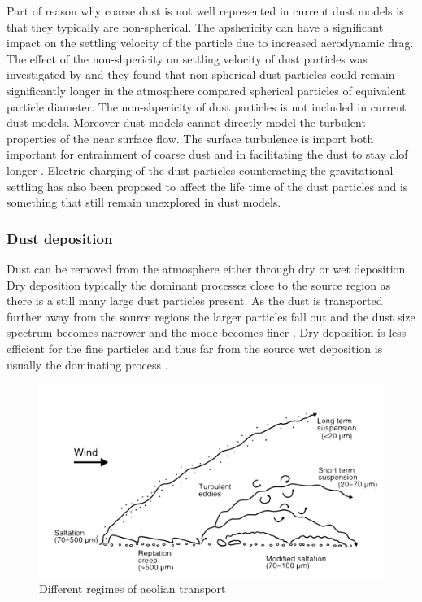 Part of reason why coarse dust is not well represented in current dust models is that they typically are non-spherical. The apshericity can have a significant impact on the settling velocity of the particle due to increased aerodynamic drag. The effect of the non-shpericity on settling velocity of dust particles was investigated by \textcite{mallios2020effects} and they found that non-spherical dust particles could remain significantly longer in the atmosphere compared spherical particles of equivalent particle diameter. The non-shpericity of dust particles is not included in current dust models. Moreover dust models cannot directly model the turbulent properties of the near surface flow. The surface turbulence is import both important for entrainment of coarse dust \parencite{klose2013large} and in facilitating the dust to stay alof longer \parencite{ryder2013impact}. Electric charging of the dust particles counteracting the gravitational settling has also been proposed to affect the life time of the dust particles and is something that still remain unexplored in dust models.     

\subsubsection{Dust deposition}
Dust can be removed from the atmosphere either through dry or wet deposition. Dry deposition typically the dominant processes close to the source region as there is a still many large dust particles present. As the dust is transported further away from the source regions the larger particles fall out and the dust size spectrum becomes narrower and the mode becomes finer \parencite{does2016particle}. Dry deposition is less efficient for the fine particles and thus far from the source wet deposition is usually the dominating process .     

\begin{figure}[htbp]
  \centering
  \includegraphics[width = \textwidth]{texfiles/figs/aeolian_transport_Parsons_Abrahams.pdf}
  \caption{Different regimes of aeolian transport \parencite{nickling2009aeolian}}
  \label{fig:modes_of_dust_transport}
\end{figure}



